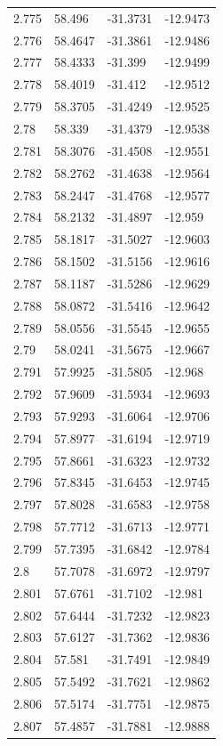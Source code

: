 \begin{tabular}{llll}
2.775 & 58.496 & -31.3731 & -12.9473 \\
2.776 & 58.4647 & -31.3861 & -12.9486 \\
2.777 & 58.4333 & -31.399 & -12.9499 \\
2.778 & 58.4019 & -31.412 & -12.9512 \\
2.779 & 58.3705 & -31.4249 & -12.9525 \\
2.78 & 58.339 & -31.4379 & -12.9538 \\
2.781 & 58.3076 & -31.4508 & -12.9551 \\
2.782 & 58.2762 & -31.4638 & -12.9564 \\
2.783 & 58.2447 & -31.4768 & -12.9577 \\
2.784 & 58.2132 & -31.4897 & -12.959 \\
2.785 & 58.1817 & -31.5027 & -12.9603 \\
2.786 & 58.1502 & -31.5156 & -12.9616 \\
2.787 & 58.1187 & -31.5286 & -12.9629 \\
2.788 & 58.0872 & -31.5416 & -12.9642 \\
2.789 & 58.0556 & -31.5545 & -12.9655 \\
2.79 & 58.0241 & -31.5675 & -12.9667 \\
2.791 & 57.9925 & -31.5805 & -12.968 \\
2.792 & 57.9609 & -31.5934 & -12.9693 \\
2.793 & 57.9293 & -31.6064 & -12.9706 \\
2.794 & 57.8977 & -31.6194 & -12.9719 \\
2.795 & 57.8661 & -31.6323 & -12.9732 \\
2.796 & 57.8345 & -31.6453 & -12.9745 \\
2.797 & 57.8028 & -31.6583 & -12.9758 \\
2.798 & 57.7712 & -31.6713 & -12.9771 \\
2.799 & 57.7395 & -31.6842 & -12.9784 \\
2.8 & 57.7078 & -31.6972 & -12.9797 \\
2.801 & 57.6761 & -31.7102 & -12.981 \\
2.802 & 57.6444 & -31.7232 & -12.9823 \\
2.803 & 57.6127 & -31.7362 & -12.9836 \\
2.804 & 57.581 & -31.7491 & -12.9849 \\
2.805 & 57.5492 & -31.7621 & -12.9862 \\
2.806 & 57.5174 & -31.7751 & -12.9875 \\
2.807 & 57.4857 & -31.7881 & -12.9888 \\

\end{tabular}
